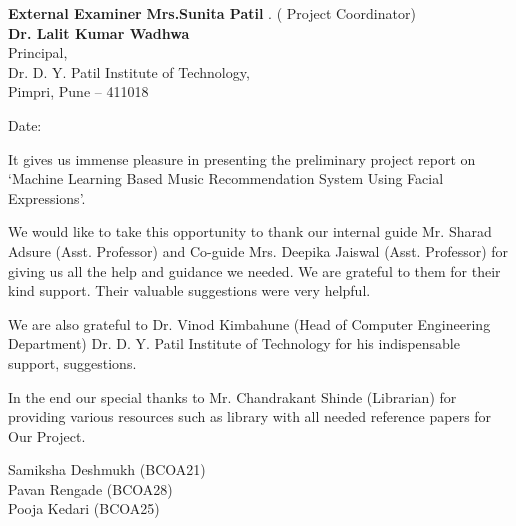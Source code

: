 \documentclass[12pt]{report}
\begin{document}
\vspace{0.7 cm}
\setlength{\parindent}{0 em}
\textbf{  External Examiner}   \hspace{7cm}      \textbf    {Mrs.Sunita Patil }   \hspace{5.5cm}         
\centering
.   \hspace{10cm}  ( Project Coordinator)  \hspace{2 cm}    \\
\vspace{0.4cm}
\centering
\textbf{Dr. Lalit Kumar Wadhwa}\\
 Principal,\\
 Dr. D. Y. Patil Institute of Technology,\\
 Pimpri, Pune – 411018
\vspace{0.1 cm}
\begin{flushleft}

Date:
\end{flushleft}


\clearpage





\vspace{4 cm}
\vspace{1 cm}
\justifying
\vspace{1 cm}
\justifying
\setlength{\parindent}{4em}
\setlength{\parskip}{1em}
\renewcommand{\baselinestretch}{1.5}
\normalsize
It gives us immense pleasure in presenting the preliminary project report on ‘Machine 
Learning Based Music Recommendation System Using Facial Expressions’.

	We would like to take this opportunity to thank our internal guide Mr. Sharad Adsure
(Asst. Professor) and Co-guide Mrs. Deepika Jaiswal (Asst. Professor) for giving us all the 
help and guidance we needed. We are grateful to them for their kind support. Their valuable
suggestions were very helpful.

	We are also grateful to Dr. Vinod Kimbahune (Head of Computer Engineering 
Department) Dr. D. Y. Patil Institute of Technology for his indispensable support, suggestions.

	In the end our special thanks to Mr. Chandrakant Shinde (Librarian) for providing
various resources such as library with all needed reference papers for Our Project.

\begin{flushright}

 Samiksha Deshmukh (BCOA21)\\
 Pavan Rengade (BCOA28) \\
Pooja Kedari (BCOA25)
\end{flushright}
\clearpage
 
\end{document}
